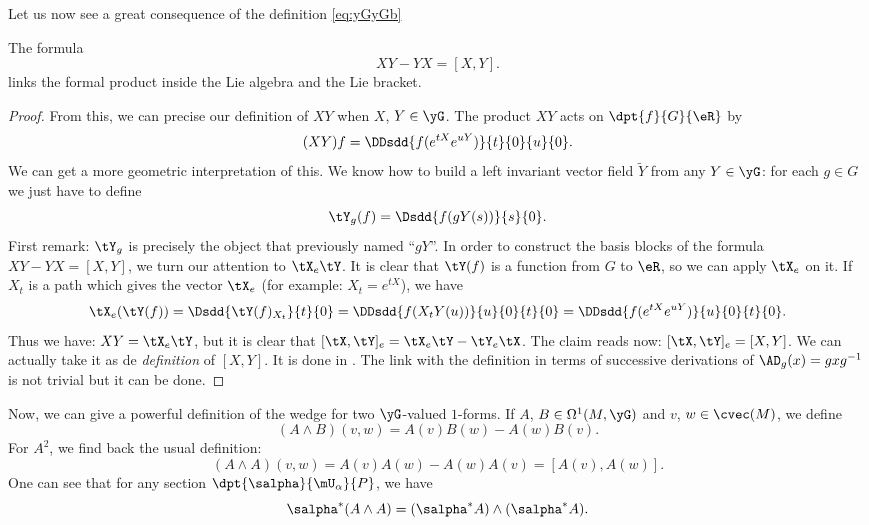 Let us now see a great consequence of the definition \eqref{eq:yGyGb}
\begin{proposition} \label{prop:XY_YX}
	The formula
	\begin{equation}
		XY-YX=[X,Y].
	\end{equation}
	links the formal product inside the Lie algebra and the Lie bracket.
\end{proposition}

\begin{proof}
	From this, we can precise our definition of $XY$ when $X$, $Y\in\yG$. The product $XY$ acts on $\dpt{f}{G}{\eR}$ by
	\[
		(XY)f=\DDsdd{f(e^{tX}e^{uY})}{t}{0}{u}{0}.
	\]
	We can get a more geometric interpretation of this. We know how to build a left invariant vector field $\tilde Y$ from any $Y\in\yG$: for each $g\in G$ we just have to define
	\[
		\tY_g(f)=\Dsdd{f(gY(s))}{s}{0}.
	\]
	First remark: $\tY_g$ is precisely the object that previously named ``$gY$''. In order to construct the basis blocks of the formula $XY-YX=[X,Y]$, we turn our attention to $\tX_e\tY$. It is clear that $\tY(f)$ is a function from $G$ to $\eR$, so we can apply $\tX_e$ on it. If $X_t$ is a path which gives the vector $\tX_e$ (for example: $X_t=e^{tX}$), we have
	\begin{equation}
		\tX_e(\tY(f))=\Dsdd{\tY(f)_{X_t}}{t}{0}\\
		=\DDsdd{f(X_tY(u))}{u}{0}{t}{0}\\
		=\DDsdd{f(e^{tX}e^{uY})}{u}{0}{t}{0}.
	\end{equation}
	Thus we have: $XY=\tX_e\tY$, but it is clear that $[\tX,\tY]_e=\tX_e\tY-\tY_e\tX$. The claim reads now: $[\tX,\tY]_e=[X,Y]$. We can actually take it as de \emph{definition} of $[X,Y]$. It is done in \cite{Helgason}. The link with the definition in terms of successive derivations of $\AD_g(x)=gxg^{-1}$ is not trivial but it can be done.
\end{proof}



Now, we can give a powerful definition of the wedge for two $\yG$-valued $1$-forms. If $A$, $B\in\Omega^1(M,\yG)$ and $v$, $w\in\cvec(M)$, we define
\begin{equation}
	(A\wedge B)(v,w)=A(v)B(w)-A(w)B(v).
\end{equation}
For $A^2$, we find back the usual definition:
\[
	(A\wedge A)(v,w)=A(v)A(w)-A(w)A(v)=[A(v),A(w)].
\]
%
One can see that for any section $\dpt{\salpha}{\mU_{\alpha}}{P}$, we have
\begin{equation}\label{eq:1907r2}
	\salpha^*(A\wedge A)=(\salpha^*A)\wedge(\salpha^*A).
\end{equation}


